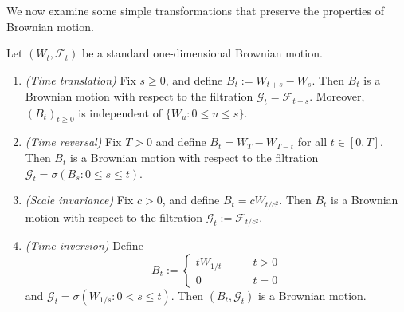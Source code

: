 We now examine some simple transformations that preserve the properties of Brownian motion.
\begin{proposition}
\label{prop:W-invariance-1d}
Let $(W_t, \mathcal{F}_t)$ be a standard one-dimensional Brownian motion. 
\begin{enumerate}[\upshape (i)]
    \item \emph{(Time translation)} Fix $s\ge 0$, and define $B_t := W_{t+s} - W_s$. Then $B_t$ is a Brownian motion with respect to the filtration $\mathcal{G}_t = \mathcal{F}_{t+s}$. Moreover, $(B_t)_{t\ge 0}$ is independent of $\{ W_u : 0\le u\le s \}$.
    
    \item \emph{(Time reversal)} Fix $T > 0$ and define $B_t = W_T - W_{T-t}$ for all $t\in [0,T]$. Then $B_t$ is a Brownian motion with respect to the filtration $\mathcal{G}_t = \sigma(B_s : 0\le s\le t)$.
    
    \item \emph{(Scale invariance)} Fix $c > 0$, and define $B_t = c W_{t/c^2}$. Then $B_t$ is a Brownian motion with respect to the filtration $\mathcal{G}_t := \mathcal{F}_{t/c^2}$.
    
    \item \emph{(Time inversion)} Define
    \begin{equation*}
        B_t := \begin{cases} t W_{1/t} \qquad & t > 0 \\
        0 & t = 0 \end{cases}
    \end{equation*}
    and $\mathcal{G}_t = \sigma(W_{1/s} : 0 < s\le t)$. Then $(B_t, \mathcal{G}_t)$ is a Brownian motion.
\end{enumerate}
\end{proposition}

